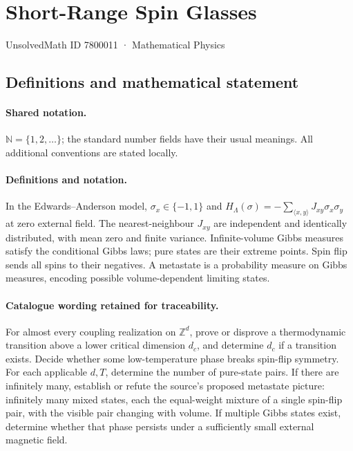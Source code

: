 \documentclass[11pt]{article}
\begin{document}
\setcounter{section}{7800010}
\section{Short-Range Spin Glasses}\label{7800011}
{\small UnsolvedMath ID 7800011 · Mathematical Physics}
\subsection{Definitions and mathematical statement}

\paragraph{Shared notation.}$\mathbb N=\{1,2,\ldots\}$; the standard number fields have their usual meanings. All additional conventions are stated locally.


\paragraph{Definitions and notation.}In the Edwards--Anderson model, $\sigma_x\in\{-1,1\}$ and $H_\Lambda(\sigma)=-\sum_{\langle x,y\rangle}J_{xy}\sigma_x\sigma_y$ at zero external field. The nearest-neighbour $J_{xy}$ are independent and identically distributed, with mean zero and finite variance. Infinite-volume Gibbs measures satisfy the conditional Gibbs laws; pure states are their extreme points. Spin flip sends all spins to their negatives. A metastate is a probability measure on Gibbs measures, encoding possible volume-dependent limiting states.

\paragraph{Catalogue wording retained for traceability.}
For almost every coupling realization on $\mathbb Z^d$, prove or disprove a thermodynamic transition above a lower critical dimension $d_c$, and determine $d_c$ if a transition exists. Decide whether some low-temperature phase breaks spin-flip symmetry. For each applicable $d,T$, determine the number of pure-state pairs. If there are infinitely many, establish or refute the source’s proposed metastate picture: infinitely many mixed states, each the equal-weight mixture of a single spin-flip pair, with the visible pair changing with volume. If multiple Gibbs states exist, determine whether that phase persists under a sufficiently small external magnetic field.
\end{document}
